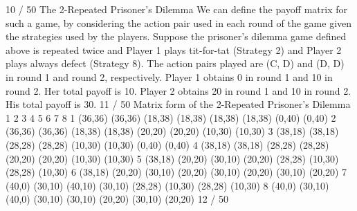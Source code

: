 \documentclass[]{report}
\begin{document}
10 / 50
The 2-Repeated Prisoner’s Dilemma
We can define the payoff matrix for such a game, by considering
the action pair used in each round of the game given the strategies
used by the players.
Suppose the prisoner’s dilemma game defined above is repeated
twice and Player 1 plays tit-for-tat (Strategy 2) and Player 2 plays
always defect (Strategy 8).
The action pairs played are (C, D) and (D, D) in round 1 and
round 2, respectively.
Player 1 obtains 0 in round 1 and 10 in round 2. Her total payoff is
10.
Player 2 obtains 20 in round 1 and 10 in round 2. His total payoff
is 30.
11 / 50
Matrix form of the 2-Repeated Prisoner’s Dilemma
1 2 3 4 5 6 7 8
1 (36,36) (36,36) (18,38) (18,38) (18,38) (18,38) (0,40) (0,40)
2 (36,36) (36,36) (18,38) (18,38) (20,20) (20,20) (10,30) (10,30)
3 (38,18) (38,18) (28,28) (28,28) (10,30) (10,30) (0,40) (0,40)
4 (38,18) (38,18) (28,28) (28,28) (20,20) (20,20) (10,30) (10,30)
5 (38,18) (20,20) (30,10) (20,20) (28,28) (10,30) (28,28) (10,30)
6 (38,18) (20,20) (30,10) (20,20) (30,10) (20,20) (30,10) (20,20)
7 (40,0) (30,10) (40,10) (30,10) (28,28) (10,30) (28,28) (10,30)
8 (40,0) (30,10) (40,0) (30,10) (30,10) (20,20) (30,10) (20,20)
12 / 50
\end{document}
